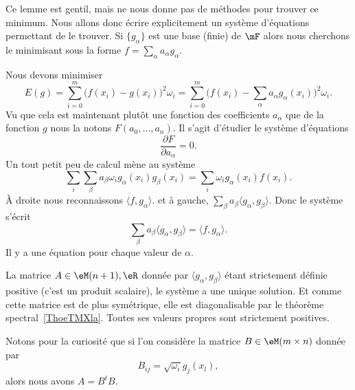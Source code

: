 \begin{normaltext}
	Ce lemme est gentil, mais ne nous donne pas de méthodes pour trouver ce minimum. Nous allons donc écrire explicitement un système d'équations permettant de le trouver. Si \( \{ g_{\alpha} \} \) est une base (finie) de \( \mF\) alors nous cherchons le minimisant sous la forme \( f=\sum_{\alpha}a_{\alpha}g_{\alpha}\).

	Nous devons minimiser
	\begin{equation}
		E(g)=\sum_{i=0}^m\big( f(x_i)-g(x_i) \big)^2\omega_i=\sum_{i=0}^m\big( f(x_i)-\sum_{\alpha}a_{\alpha}g_{\alpha}(x_i) \big)^2\omega_i.
	\end{equation}
	Vu que cela est maintenant plutôt une fonction des coefficients \( a_{\alpha}\) que de la fonction \( g\) nous la notons \( F(a_0,\ldots, a_n)\). Il s'agit d'étudier le système d'équations
	\begin{equation}
		\frac{ \partial F }{ \partial a_{\alpha} }=0.
	\end{equation}
	Un tout petit peu de calcul mène au système
	\begin{equation}
		\sum_i\sum_{\beta}a_{\beta}\omega_ig_{\alpha}(x_i)g_{\beta}(x_i)=\sum_{i}\omega_ig_{\alpha}(x_i)f(x_i).
	\end{equation}
	À droite nous reconnaissons \( \langle f, g_{\alpha}\rangle \). et à gauche, \( \sum_{\beta}a_{\beta}\langle g_{\alpha}, g_{\beta}\rangle \). Donc le système s'écrit
	\begin{equation}
		\sum_{\beta}a_{\beta}\langle g_{\alpha}, g_{\beta}\rangle =\langle f, g_{\alpha}\rangle .
	\end{equation}
	Il y a une équation pour chaque valeur de \( \alpha\).

	La matrice \( A\in\eM(n+1),\eR\) donnée par  \( \langle g_{\alpha}, g_{\beta}\rangle \) étant strictement définie positive (c'est un produit scalaire), le système a une unique solution. Et comme cette matrice est de plus symétrique, elle est diagonalisable par le théorème spectral~\ref{ThoeTMXla}. Toutes ses valeurs propres sont strictement positives.

	Notons pour la curiosité que si l'on considère la matrice \( B\in\eM(m\times n)\) donnée par
	\begin{equation}
		B_{ij}=\sqrt{ \omega_i }g_j(x_l),
	\end{equation}
	alors nous avons \( A=B^tB\).
\end{normaltext}

